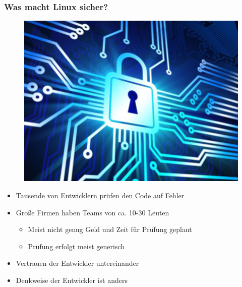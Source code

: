 \begin{frame}
\frametitle{Was macht Linux sicher?}
\begin{figure}
\includegraphics[scale=0.3]{resources/infosec.jpg}
\end{figure}
\begin{itemize}
	\item Tausende von Entwicklern prüfen den Code auf Fehler
	\item Große Firmen haben Teams von ca. 10-30 Leuten 
	\begin{itemize}
		\item Meist nicht genug Geld und Zeit für Prüfung geplant
		\item Prüfung erfolgt meist generisch
	\end{itemize}
	\item Vertrauen der Entwickler untereinander
	\item Denkweise der Entwickler ist anders
\end{itemize}
\end{frame}

